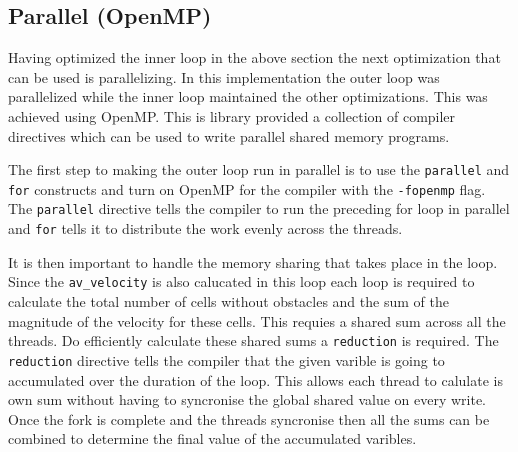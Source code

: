 \documentclass{article}
\begin{document}
\begin{multicols}{2}


\section{Parallel (OpenMP)}

Having optimized the inner loop in the above section the next optimization that
can be used is parallelizing. In this implementation the outer loop was
parallelized while the inner loop maintained the other optimizations. This was
achieved using OpenMP. This is library provided a collection of compiler
directives which can be used to write parallel shared memory programs.

The first step to making the outer loop run in parallel is to use the
\verb|parallel| and \verb|for| constructs and turn on OpenMP for the compiler with the
\verb|-fopenmp| flag. The \verb|parallel| directive tells the compiler to run
the preceding for loop in parallel and \verb|for| tells it to distribute the
work evenly across the threads.

It is then important to handle the memory sharing that takes place in the loop.
Since the \verb|av_velocity| is also calucated in this loop each loop is
required to calculate the total number of cells without obstacles and the sum
of the magnitude of the velocity for these cells. This requies a shared sum
across all the threads. Do efficiently calculate these shared sums a
\verb|reduction| is required. The \verb|reduction| directive tells the compiler
that the given varible is going to accumulated over the duration of the loop.
This allows each thread to calulate is own sum without having to syncronise the
global shared value on every write. Once the fork is complete and the threads
syncronise then all the sums can be combined to determine the final value of
the accumulated varibles. 


\end{multicols}
\end{document}
